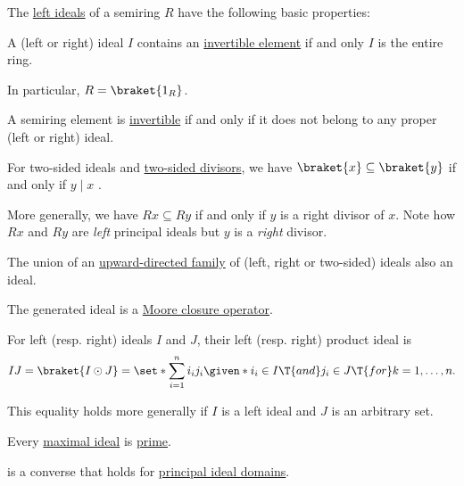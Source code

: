 \begin{proposition}\label{thm:def:semiring_ideal}
  The \hyperref[def:semiring_ideal]{left ideals} of a semiring \( R \) have the following basic properties:
  \begin{thmenum}
     A (left or right) ideal \( I \) contains an \hyperref[def:semiring_divisibility/invertible]{invertible element} if and only \( I \) is the entire ring.

    In particular, \( R = \braket{ 1_R } \).

     A semiring element is \hyperref[def:semiring_divisibility/invertible]{invertible} if and only if it does not belong to any proper (left or right) ideal.

     For two-sided ideals and \hyperref[def:semiring_divisibility]{two-sided divisors}, we have \( \braket{ x } \subseteq \braket{ y } \) if and only if \( y \mid x \) .

    More generally, we have \( Rx \subseteq Ry \) if and only if \( y \) is a right divisor of \( x \). Note how \( Rx \) and \( Ry \) are \emph{left} principal ideals but \( y \) is a \emph{right} divisor.

     The union of an \hyperref[def:directed_set]{upward-directed family} of (left, right or two-sided) ideals also an ideal.

     The generated ideal is a \hyperref[def:moore_closure_operator]{Moore closure operator}.

     For left (resp. right) ideals \( I \) and \( J \), their left (resp. right) product ideal is
    \begin{equation}\label{eq:thm:def:semiring_ideal/product}
      IJ = \braket{ I \odot J } = \set*{ \sum_{i=1}^n i_i j_i \given* i_i \in I \T{and} j_i \in J \T{for} k = 1, \ldots, n }.
    \end{equation}

    This equality holds more generally if \( I \) is a left ideal and \( J \) is an arbitrary set.

     Every \hyperref[def:semiring_ideal/maximal]{maximal ideal} is \hyperref[def:semiring_ideal/prime]{prime}.

     is a converse that holds for \hyperref[def:principal_ideal_domain]{principal ideal domains}.


\end{thmenum}
\end{proposition}
